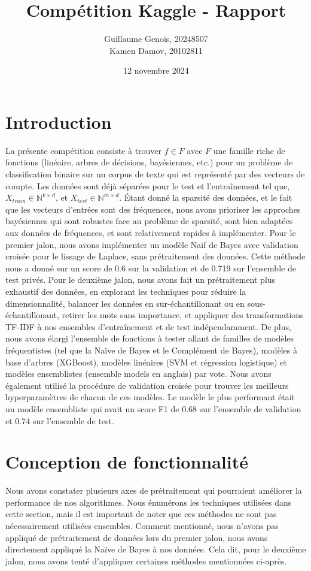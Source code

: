 \documentclass{article}
\title{Compétition Kaggle - Rapport}
\author{Guillaume Genois, 20248507 \\Kamen Damov, 20102811}
\date{12 novembre 2024}
\begin{document}
\maketitle

\section{Introduction}
La présente compétition consiste à trouver $f \in F$ avec $F$ une famille riche de fonctions (linéaire, arbres de décisions, bayésiennes, etc.) pour un problème de classification binaire sur un corpus de texte qui est représenté par des vecteurs de compte. Les données sont déjà séparées pour le test et l'entraînement tel que, $X_{train} \in \mathbb{N}^{k \times d}$, et $X_{test} \in \mathbb{N}^{m \times d}$. Étant donné la sparsité des données, et le fait que les vecteurs d'entrées sont des fréquences, nous avons prioriser les approches bayésiennes qui sont robustes face au problème de sparsité, sont bien adaptées aux données de fréquences, et sont relativement rapides à implémenter. Pour le premier jalon, nous avons implémenter un modèle Naif de Bayes avec validation croisée pour le lissage de Laplace, sans prétraitement des données. Cette méthode nous a donné sur un score de 0.6 sur la validation et de 0.719  sur l'ensemble de test privés. Pour le deuxième jalon, nous avons fait un prétraitement plus exhaustif des données, en explorant les techniques pour réduire la dimensionnalité, balancer les données en sur-échantillonant ou en sous-échantillonant, retirer les mots sans importance, et appliquer des transformations TF-IDF à nos ensembles d'entraînement et de test indépendamment. De plus, nous avons élargi l'ensemble de fonctions à tester allant de familles de modèles fréquentistes (tel que la Naïve de Bayes et le Complément de Bayes), modèles à base d'arbres (XGBoost), modèles linéaires (SVM et régression logistique) et modèles ensemblistes (ensemble models en anglais) par vote. Nous avons également utilisé la procédure de validation croisée pour trouver les meilleurs hyperparamètres de chacun de ces modèles. Le modèle le plus performant était un modèle ensembliste qui avait un score F1 de 0.68 sur l'ensemble de validation et 0.74 sur l'ensemble de test.

\section{Conception de fonctionnalité}
Nous avons constater plusieurs axes de prétraitement qui pourraient améliorer la performance de nos algorithmes. Nous énumérons les techniques utilisées dans cette section, mais il est important de noter que ces méthodes ne sont pas nécessairement utilisées ensembles. Comment mentionné, nous n'avons pas appliqué de prétraitement de données lors du premier jalon, nous avons directement appliqué la Naïve de Bayes à nos données. Cela dit, pour le deuxième jalon, nous avons tenté d'appliquer certaines méthodes mentionnées ci-après.
\end{document}
